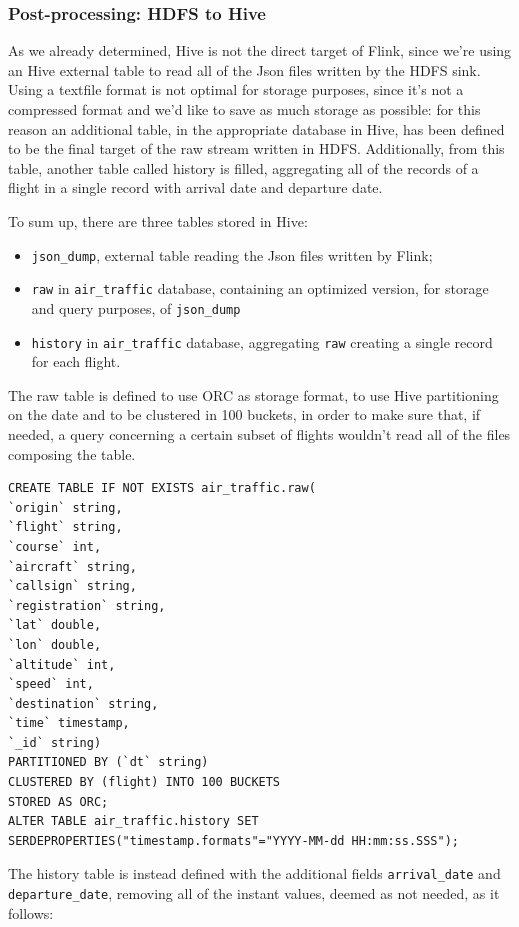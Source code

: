 \subsubsection{Post-processing: HDFS to Hive}

As we already determined, Hive is not the direct target of Flink, since we're using an Hive external table to read all of the Json files written by the HDFS sink. Using a textfile format is not optimal for storage purposes, since it's not a compressed format and we'd like to save as much storage as possible: for this reason an additional table, in the appropriate database in Hive, has been defined to be the final target of the raw stream written in HDFS. Additionally, from this table, another table called history is filled, aggregating all of the records of a flight in a single record with arrival date and departure date.

To sum up, there are three tables stored in Hive:
\begin{itemize}
    \item \texttt{json\_dump}, external table reading the Json files written by Flink;
    \item \texttt{raw} in \texttt{air\_traffic} database, containing an optimized version, for storage and query purposes, of \texttt{json\_dump} 
    \item \texttt{history} in \texttt{air\_traffic} database, aggregating \texttt{raw} creating a single record for each flight.
\end{itemize}

The raw table is defined to use ORC as storage format, to use Hive partitioning on the date and to be clustered in 100 buckets, in order to make sure that, if needed, a query concerning a certain subset of flights wouldn't read all of the files composing the table.

\begin{verbatim}
CREATE TABLE IF NOT EXISTS air_traffic.raw(
`origin` string,
`flight` string,
`course` int,
`aircraft` string,
`callsign` string,
`registration` string,
`lat` double,
`lon` double,
`altitude` int,
`speed` int,
`destination` string,
`time` timestamp,
`_id` string)
PARTITIONED BY (`dt` string)
CLUSTERED BY (flight) INTO 100 BUCKETS
STORED AS ORC;
ALTER TABLE air_traffic.history SET SERDEPROPERTIES("timestamp.formats"="YYYY-MM-dd HH:mm:ss.SSS");
\end{verbatim}

The history table is instead defined with the additional fields \texttt{arrival\_date} and \texttt{departure\_date}, removing all of the instant values, deemed as not needed, as it follows:

